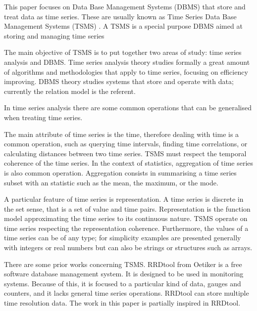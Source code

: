 
This paper focuses on Data Base Management Systems (DBMS) that store
and treat data as time series. These are usually known as Time Series
Data Base Management Systems (TSMS) \cite{dreyer94}.  A TSMS is a
special purpose DBMS aimed at storing and managing time series

The main objective of TSMS is to put together two areas of study: time
series analysis and DBMS.  Time series analysis theory studies
formally a great amount of algorithms and methodologies that apply to
time series, focusing on efficiency improving. DBMS theory studies
systems that store and operate with data; currently the relation model
\cite{date:introduction} is the referent.


In time series analysis there are some common operations that can be
generalised when treating time series.

The main attribute of time series is the time, therefore dealing with
time is a common operation, such as querying time intervals, finding
time correlations, or calculating distances between two time
series. TSMS must respect the temporal coherence of the time series.
In the context of statistics, aggregation of time series is also
common operation. Aggregation consists in summarising a time series
subset with an statistic such as the mean, the maximum, or the mode.

A particular feature of time series is representation. A time series
is discrete in the set sense, that is a set of value and time
pairs. Representation is the function model approximating the time
series to its continuous nature. TSMS operate on time series
respecting the representation coherence. Furthermore, the values of a
time series can be of any type; for simplicity examples are presented
generally with integers or real numbers but can also be strings or
structures such as arrays.


There are some prior works concerning TSMS. RRDtool from Oetiker
\cite{rrdtool} is a free software database management system. It is
designed to be used in monitoring systems. Because of this, it is
focused to a particular kind of data, gauges and counters, and it
lacks general time series operations. RRDtool can store multiple time
resolution data. The work in this paper is partially inspired in
RRDtool.

